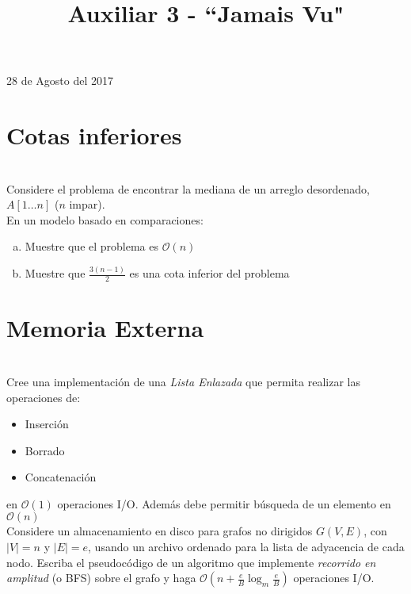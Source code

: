 \documentclass[dcc,uchile]{fcfmcourse}
\title{Auxiliar 3 - ``Jamais Vu"}
\theoremstyle{plain}
\theoremstyle{definition}
\begin{document}
\maketitle
\begin{center}
28 de Agosto del 2017
\end{center}


\vspace{-1ex}


\begin{problems}
\section*{Cotas inferiores}
\\
Considere el problema de encontrar la mediana de un arreglo desordenado, $A[1\ldots n]$ ($n$ impar).\\
En un modelo basado en comparaciones:
\begin{enumerate}[a)]
    \item Muestre que el problema es $\mathcal{O}(n)$
    \item Muestre que $\frac{3(n-1)}{2}$ es una cota inferior del problema
\end{enumerate}
\section*{Memoria Externa}
\\
Cree una implementación de una \textit{Lista Enlazada} que permita realizar las operaciones de:
\begin{itemize}
    \item Inserción
    \item Borrado
    \item Concatenación
\end{itemize}
en $\mathcal{O}(1)$ operaciones I/O. Además debe permitir búsqueda de un elemento en $\mathcal{O}(n)$
\\
Considere un almacenamiento en disco para grafos no dirigidos $G(V, E)$, con $|V| = n$ y $|E| = e$, usando un archivo ordenado para la lista de adyacencia de cada nodo. Escriba el pseudocódigo de un algoritmo que implemente \textit{recorrido en amplitud} (o BFS) sobre el grafo y haga $\mathcal{O}(n + \frac{e}{B}\log_{m} \frac{e}{B})$ operaciones I/O.
\end{problems}
\end{document}
